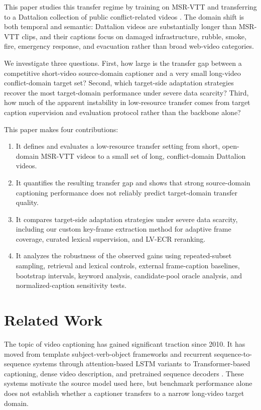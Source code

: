 \documentclass[pdflatex,sn-mathphys-num]{sn-jnl}
\theoremstyle{thmstyleone}
\theoremstyle{thmstyletwo}
\theoremstyle{thmstylethree}
\begin{document}
This paper studies this transfer regime by training on MSR-VTT \cite{MSR-VTTdataset} and transferring to a Dattalion collection of public conflict-related videos \cite{dattalion}. The domain shift is both temporal and semantic: Dattalion videos are substantially longer than MSR-VTT clips, and their captions focus on damaged infrastructure, rubble, smoke, fire, emergency response, and evacuation rather than broad web-video categories.

We investigate three questions. First, how large is the transfer gap between a competitive short-video source-domain captioner and a very small long-video conflict-domain target set? Second, which target-side adaptation strategies recover the most target-domain performance under severe data scarcity? Third, how much of the apparent instability in low-resource transfer comes from target caption supervision and evaluation protocol rather than the backbone alone?

This paper makes four contributions:
\begin{enumerate}
    \item It defines and evaluates a low-resource transfer setting from short, open-domain MSR-VTT videos to a small set of long, conflict-domain Dattalion videos.
    \item It quantifies the resulting transfer gap and shows that strong source-domain captioning performance does not reliably predict target-domain transfer quality.
    \item It compares target-side adaptation strategies under severe data scarcity, including our custom key-frame extraction method for adaptive frame coverage, curated lexical supervision, and LV-ECR reranking.
    \item It analyzes the robustness of the observed gains using repeated-subset sampling, retrieval and lexical controls, external frame-caption baselines, bootstrap intervals, keyword analysis, candidate-pool oracle analysis, and normalized-caption sensitivity tests.
\end{enumerate}

\section{Related Work}\label{sec2}
The topic of video captioning has gained significant traction since 2010. It has moved from template subject-verb-object frameworks and recurrent sequence-to-sequence systems \cite{Jain2022,venugopalan2015sequence} through attention-based LSTM variants \cite{gao2017attentionlstm,pan2017semantic,10.1145/3343031.3350932,li2019residual} to Transformer-based captioning, dense video description, and pretrained sequence decoders \cite{zhou2018maskedtransformer,iashin2020densevidcap,bhooshan2022multimodaltransformer,zhao2022hierarchical,wang2023threestream,yang2023vid2seq}. These systems motivate the source model used here, but benchmark performance alone does not establish whether a captioner transfers to a narrow long-video target domain.
\end{document}
